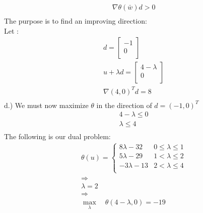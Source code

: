 \documentclass[12pt]{article}
\begin{document}
        \begin{align*}
            &\nabla \theta(\bar w) d > 0\\
        \end{align*}
    The purpose is to find an improving direction: \\
    Let :\\
        \begin{align*}
            &d = 
                \begin{bmatrix}
                    -1 \\
                    0\\
                \end{bmatrix}\\
            & u + \lambda d = 
                \begin{bmatrix}
                    4 - \lambda \\
                    0\\
                \end{bmatrix}\\
            &\nabla (4,0)^T d = 8 \\
        \end{align*}
    d.) We must now maximize $\theta$ in the direction of $d = (-1,0)^T$\\
        \begin{align*}
            &4-\lambda \leq 0\\
            &\lambda \leq 4\\
        \end{align*}
    The following is our dual problem:\\
        \begin{align*}
            &\theta(u) = 
                \begin{cases} 
                    8\lambda -32 & 0 \leq \lambda \leq 1\\
                    5\lambda -29 & 1 < \lambda \leq 2\\
                    -3\lambda -13 & 2 < \lambda \leq 4\\
                \end{cases}\\
            &\Rightarrow\\
            &\lambda = 2 \\
            &\Rightarrow\\
            &\max_{\lambda} \quad \theta(4-\lambda, 0) = -19\\
        \end{align*}
\end{document}
